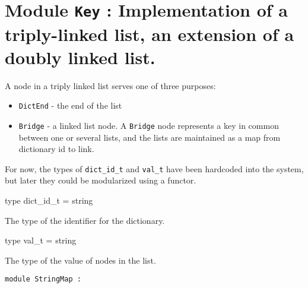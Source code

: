 \documentclass[11pt]{article}
\begin{document}
\tableofcontents
\section{Module {\tt{Key}} : Implementation of a triply-linked list, an extension of a doubly linked
    list.}
\label{module:Key}
 A node in a triply linked list serves one of three purposes:


    \begin{itemize}
\item {\tt{DictEnd}} - the end of the list
\item {\tt{Bridge}} - a linked list node. A {\tt{Bridge}} node represents a key in
    common between one or several lists, and the lists are maintained as
    a map from dictionary id to link.
\end{itemize}



    For now, the types of {\tt{dict\_id\_t}} and {\tt{val\_t}} have been hardcoded into
    the system, but later they could be modularized using a functor.



\ocamldocvspace{0.5cm}



\label{type:Key.dict-underscoreid-underscoret}\begin{ocamldoccode}
type dict_id_t = string 
\end{ocamldoccode}
\begin{ocamldocdescription}
The type of the identifier for the dictionary.


\end{ocamldocdescription}




\label{type:Key.val-underscoret}\begin{ocamldoccode}
type val_t = string 
\end{ocamldoccode}
\begin{ocamldocdescription}
The type of the value of nodes in the list.


\end{ocamldocdescription}




\begin{ocamldoccode}
{\tt{module }}{\tt{StringMap}}{\tt{ : }}\end{ocamldoccode}
\label{module:Key.StringMap}
\end{document}
